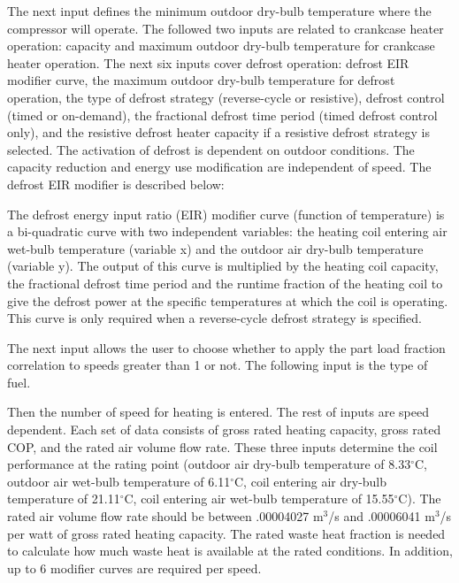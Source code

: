 The next input defines the minimum outdoor dry-bulb temperature where the compressor will operate. The followed two inputs are related to crankcase heater operation: capacity and maximum outdoor dry-bulb temperature for crankcase heater operation. The next six inputs cover defrost operation: defrost EIR modifier curve, the maximum outdoor dry-bulb temperature for defrost operation, the type of defrost strategy (reverse-cycle or resistive), defrost control (timed or on-demand), the fractional defrost time period (timed defrost control only), and the resistive defrost heater capacity if a resistive defrost strategy is selected. The activation of defrost is dependent on outdoor conditions. The capacity reduction and energy use modification are independent of speed. The defrost EIR modifier is described below:

The defrost energy input ratio (EIR) modifier curve (function of temperature) is a bi-quadratic curve with two independent variables: the heating coil entering air wet-bulb temperature (variable x) and the outdoor air dry-bulb temperature (variable y). The output of this curve is multiplied by the heating coil capacity, the fractional defrost time period and the runtime fraction of the heating coil to give the defrost power at the specific temperatures at which the coil is operating. This curve is only required when a reverse-cycle defrost strategy is specified.

The next input allows the user to choose whether to apply the part load fraction correlation to speeds greater than 1 or not. The following input is the type of fuel.

Then the number of speed for heating is entered. The rest of inputs are speed dependent. Each set of data consists of gross rated heating capacity, gross rated COP, and the rated air volume flow rate. These three inputs determine the coil performance at the rating point (outdoor air dry-bulb temperature of 8.33$^\circ$C, outdoor air wet-bulb temperature of 6.11$^\circ$C, coil entering air dry-bulb temperature of 21.11$^\circ$C, coil entering air wet-bulb temperature of 15.55$^\circ$C). The rated air volume flow rate should be between .00004027 m\(^{3}\)/s and .00006041 m\(^{3}\)/s per watt of gross rated heating capacity. The rated waste heat fraction is needed to calculate how much waste heat is available at the rated conditions. In addition, up to 6 modifier curves are required per speed.

